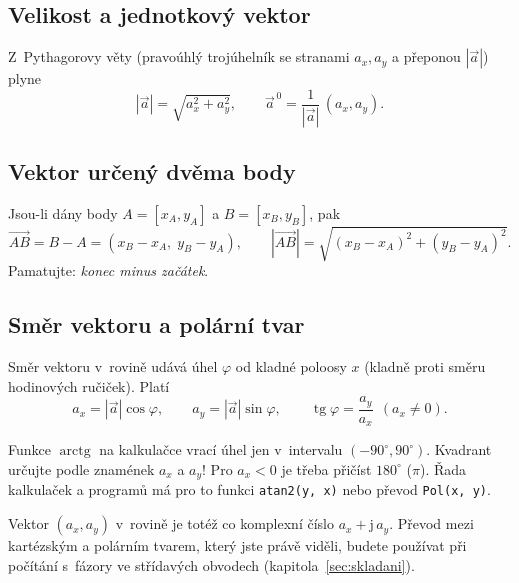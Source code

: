 \documentclass[a4paper,11pt]{article}
\newcommand{\abs}[1]{\left\lvert #1\right\rvert}
\newcommand{\jimag}{\mathrm{j}}          %
\begin{document}
\subsection{Velikost a jednotkový vektor}

Z~Pythagorovy věty (pravoúhlý trojúhelník se stranami $a_x,a_y$ a přeponou
$\abs{\vec a}$) plyne
\begin{equation}
  \abs{\vec a}=\sqrt{a_x^2+a_y^2},\qquad
  \vec a^{\,0}=\frac{1}{\abs{\vec a}}\,(a_x,a_y).
\end{equation}

\subsection{Vektor určený dvěma body}

Jsou-li dány body $A=[x_A,y_A]$ a $B=[x_B,y_B]$, pak
\begin{equation}
  \overrightarrow{AB}=B-A=(x_B-x_A,\;y_B-y_A),\qquad
  \abs{\overrightarrow{AB}}=\sqrt{(x_B-x_A)^2+(y_B-y_A)^2}.
\end{equation}
Pamatujte: \emph{konec minus začátek}.

\subsection{Směr vektoru a polární tvar}

Směr vektoru v~rovině udává úhel $\varphi$ od kladné poloosy $x$ (kladně proti směru
hodinových ručiček). Platí
\begin{equation}
  a_x=\abs{\vec a}\cos\varphi,\qquad a_y=\abs{\vec a}\sin\varphi,\qquad
  \operatorname{tg}\varphi=\frac{a_y}{a_x}\ \ (a_x\neq0).
\end{equation}

\begin{pozor}
Funkce $\operatorname{arctg}$ na kalkulačce vrací úhel jen v~intervalu
$(-90^\circ,90^\circ)$. Kvadrant určujte podle znamének $a_x$ a $a_y$! Pro
$a_x<0$ je třeba přičíst $180^\circ$ ($\pi$). Řada kalkulaček a programů má pro
to funkci \texttt{atan2(y, x)} nebo převod \texttt{Pol(x, y)}.
\end{pozor}

\begin{ekt}
Vektor $(a_x,a_y)$ v~rovině je totéž co komplexní číslo $a_x+\jimag\,a_y$.
Převod mezi kartézským a polárním tvarem, který jste právě viděli, budete
používat při počítání s~fázory ve střídavých obvodech (kapitola~\ref{sec:skladani}).
\end{ekt}
\end{document}

